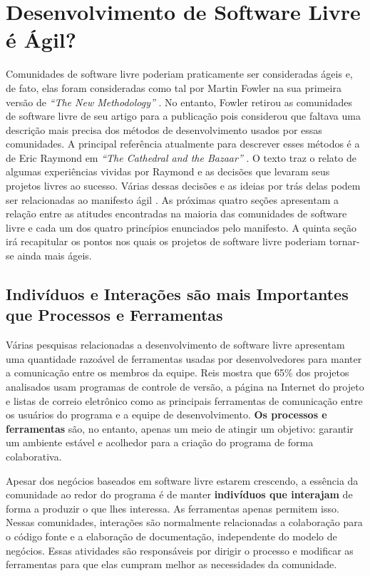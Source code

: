 \chapter{Desenvolvimento de Software Livre é Ágil?}
\label{cap:foss}

Comunidades de software livre poderiam praticamente ser consideradas
ágeis e, de fato, elas foram consideradas como tal por Martin Fowler
na sua primeira versão de \emph{``The New Methodology''}
\cite{Fowler00orig}. No entanto, Fowler retirou as comunidades de
software livre de seu artigo para a publicação pois considerou que
faltava uma descrição mais precisa dos métodos de desenvolvimento
usados por essas comunidades. A principal referência atualmente para
descrever esses métodos é a de Eric Raymond em \emph{``The Cathedral
  and the Bazaar''} \cite{Raymond1999}. O texto traz o relato de
algumas experiências vividas por Raymond e as decisões que levaram
seus projetos livres ao sucesso. Várias dessas decisões e as ideias
por trás delas podem ser relacionadas ao manifesto ágil
\cite{AgileManifesto}. As próximas quatro seções apresentam a relação
entre as atitudes encontradas na maioria das comunidades de software
livre e cada um dos quatro princípios enunciados pelo manifesto. A
quinta seção irá recapitular os pontos nos quais os projetos de
software livre poderiam tornar-se ainda mais ágeis.

\section{Indivíduos e Interações são mais Importantes que Processos e
  Ferramentas}
\label{sec:first-princ}

Várias pesquisas relacionadas a desenvolvimento de software livre
apresentam uma quantidade razoável de ferramentas usadas por
desenvolvedores para manter a comunicação entre os membros da
equipe. Reis \cite{Reis2003} mostra que 65\% dos projetos analisados
usam programas de controle de versão, a página na Internet do projeto
e listas de correio eletrônico como as principais ferramentas de
comunicação entre os usuários do programa e a equipe de
desenvolvimento. \textbf{Os processos e ferramentas} são, no entanto,
apenas um meio de atingir um objetivo: garantir um ambiente estável e
acolhedor para a criação do programa de forma colaborativa.

Apesar dos negócios baseados em software livre estarem crescendo, a
essência da comunidade ao redor do programa é de manter
\textbf{indivíduos que interajam} de forma a produzir o que lhes
interessa. As ferramentas apenas permitem isso. Nessas comunidades,
interações são normalmente relacionadas a colaboração para o código
fonte e a elaboração de documentação, independente do modelo de
negócios. Essas atividades são responsáveis por dirigir o processo e
modificar as ferramentas para que elas cumpram melhor as necessidades
da comunidade.

